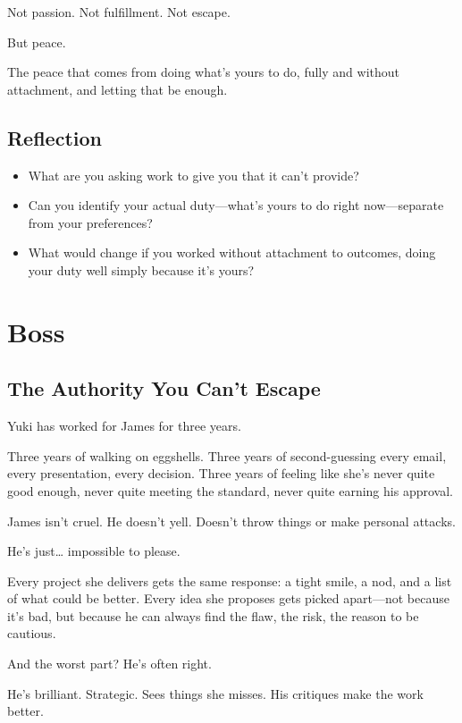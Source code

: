 \documentclass[11pt,twoside]{book}
\begin{document}
Not passion. Not fulfillment. Not escape.

But peace.

The peace that comes from doing what's yours to do, fully and without attachment, and letting that be enough.

\section*{Reflection}

\begin{itemize}
\item What are you asking work to give you that it can't provide?
\item Can you identify your actual duty—what's yours to do right now—separate from your preferences?
\item What would change if you worked without attachment to outcomes, doing your duty well simply because it's yours?
\end{itemize}

\chapter{Boss}

\section*{The Authority You Can't Escape}

Yuki has worked for James for three years.

Three years of walking on eggshells. Three years of second-guessing every email, every presentation, every decision. Three years of feeling like she's never quite good enough, never quite meeting the standard, never quite earning his approval.

James isn't cruel. He doesn't yell. Doesn't throw things or make personal attacks.

He's just\ldots{} impossible to please.

Every project she delivers gets the same response: a tight smile, a nod, and a list of what could be better. Every idea she proposes gets picked apart—not because it's bad, but because he can always find the flaw, the risk, the reason to be cautious.

And the worst part? He's often right.

He's brilliant. Strategic. Sees things she misses. His critiques make the work better.
\end{document}
